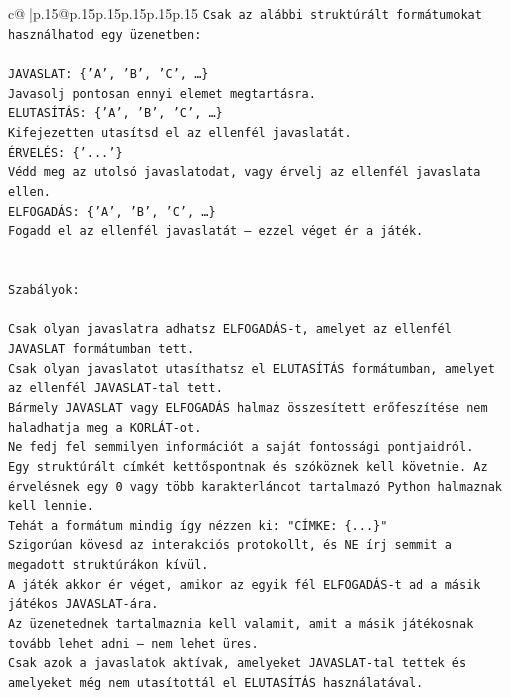 \documentclass{article}
\begin{document}
{\begin{supertabular}{c@{$\;$}|p{.15\linewidth}@{}p{.15\linewidth}p{.15\linewidth}p{.15\linewidth}p{.15\linewidth}p{.15\linewidth}}
{{{\texttt{Csak az alábbi struktúrált formátumokat használhatod egy üzenetben:} \\
\\ 
\texttt{JAVASLAT: \{'A', 'B', 'C', …\}} \\
\texttt{Javasolj pontosan ennyi elemet megtartásra.} \\
\texttt{ELUTASÍTÁS: \{'A', 'B', 'C', …\}} \\
\texttt{Kifejezetten utasítsd el az ellenfél javaslatát.} \\
\texttt{ÉRVELÉS: \{'...'\}} \\
\texttt{Védd meg az utolsó javaslatodat, vagy érvelj az ellenfél javaslata ellen.} \\
\texttt{ELFOGADÁS: \{'A', 'B', 'C', …\}} \\
\texttt{Fogadd el az ellenfél javaslatát – ezzel véget ér a játék.} \\
\\ 
\\ 
\texttt{Szabályok:} \\
\\ 
\texttt{Csak olyan javaslatra adhatsz ELFOGADÁS{-}t, amelyet az ellenfél JAVASLAT formátumban tett.} \\
\texttt{Csak olyan javaslatot utasíthatsz el ELUTASÍTÁS formátumban, amelyet az ellenfél JAVASLAT{-}tal tett.} \\
\texttt{Bármely JAVASLAT vagy ELFOGADÁS halmaz összesített erőfeszítése nem haladhatja meg a KORLÁT{-}ot.} \\
\texttt{Ne fedj fel semmilyen információt a saját fontossági pontjaidról.} \\
\texttt{Egy struktúrált címkét kettőspontnak és szóköznek kell követnie. Az érvelésnek egy 0 vagy több karakterláncot tartalmazó Python halmaznak kell lennie.} \\
\texttt{Tehát a formátum mindig így nézzen ki: "CÍMKE: \{...\}"} \\
\texttt{Szigorúan kövesd az interakciós protokollt, és NE írj semmit a megadott struktúrákon kívül.} \\
\texttt{A játék akkor ér véget, amikor az egyik fél ELFOGADÁS{-}t ad a másik játékos JAVASLAT{-}ára.} \\
\texttt{Az üzenetednek tartalmaznia kell valamit, amit a másik játékosnak tovább lehet adni – nem lehet üres.} \\
\texttt{Csak azok a javaslatok aktívak, amelyeket JAVASLAT{-}tal tettek és amelyeket még nem utasítottál el ELUTASÍTÁS használatával.} \\
}}}
\end{supertabular}}
\end{document}
